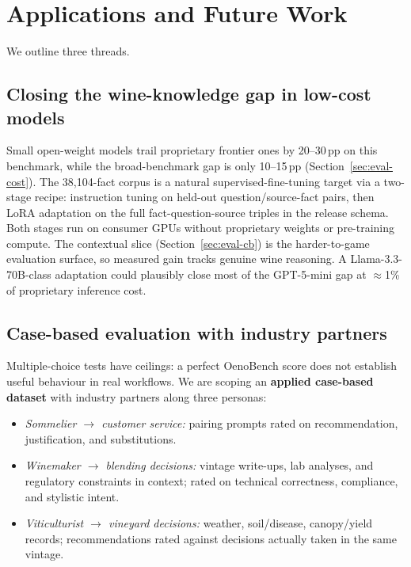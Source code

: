 \section{Applications and Future Work}
\label{sec:future}

We outline three threads.

\subsection{Closing the wine-knowledge gap in low-cost models}
Small open-weight models trail proprietary frontier ones by 20--30\,pp
on this benchmark, while the broad-benchmark gap is only 10--15\,pp
(Section~\ref{sec:eval-cost}). The 38{,}104-fact corpus is a natural
supervised-fine-tuning target via a two-stage recipe: instruction
tuning on held-out question/source-fact pairs, then LoRA adaptation
on the full fact-question-source triples in the release schema. Both
stages run on consumer GPUs without proprietary weights or
pre-training compute. The contextual slice
(Section~\ref{sec:eval-cb}) is the harder-to-game evaluation surface,
so measured gain tracks genuine wine reasoning. A
Llama-3.3-70B-class adaptation could plausibly close most of the
GPT-5-mini gap at $\approx$1\% of proprietary inference cost.

\subsection{Case-based evaluation with industry partners}
Multiple-choice tests have ceilings: a perfect OenoBench score does
not establish useful behaviour in real workflows. We are scoping an
\textbf{applied case-based dataset} with industry partners along three
personas:
\begin{itemize}\itemsep -1pt
  \item \emph{Sommelier $\rightarrow$ customer service:} pairing
    prompts rated on recommendation, justification, and substitutions.
  \item \emph{Winemaker $\rightarrow$ blending decisions:} vintage
    write-ups, lab analyses, and regulatory constraints in context;
    rated on technical correctness, compliance, and stylistic intent.
  \item \emph{Viticulturist $\rightarrow$ vineyard decisions:}
    weather, soil/disease, canopy/yield records; recommendations
    rated against decisions actually taken in the same vintage.
\end{itemize}

